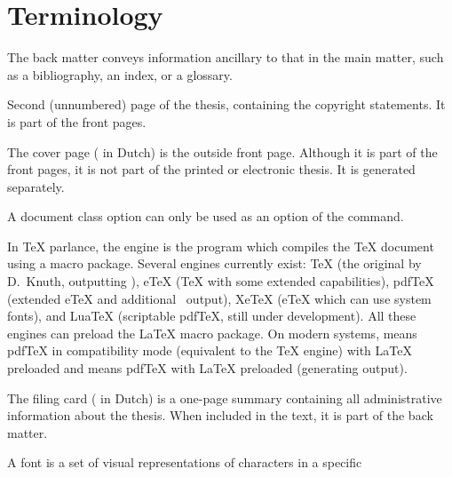 \newenvironment{termlist}%
 {\renewcommand*\descriptionlabel[1]{\hspace\labelsep
    \normalfont\scshape ##1}%
  \let\olditem\item
  \renewcommand*\item[1][??]{\olditem[##1]\leavevmode\newline\ignorespaces}%
  \newcommand*\latex{\unskip\quad\upshape (LaTeX)}%
  \description}%
 {\enddescription}

\chapter{Terminology}
\label{cha:terminology}
\begin{termlist}
\item[Back matter]
  The back matter conveys information ancillary to that in the main matter,
  such as a bibliography, an index, or a glossary.
\item[Copyright page]
  Second (unnumbered) page of the thesis, containing the copyright
  statements. It is part of the front pages.
\item[Cover page]
  The cover page ( in Dutch) is the outside front page.
  Although it is part of the front pages, it is not part of the printed or
  electronic thesis. It is generated separately.
\item[Document class option \latex]
  A document class option can only be used as an option of the
   command.
\item[Engine \latex]
  In TeX parlance, the engine is the program which compiles the TeX
  document using a macro package. Several engines currently exist: TeX (the
  original by D.\ Knuth, outputting ), eTeX (TeX with some
  extended capabilities), pdfTeX (extended eTeX and additional \PDF\
  output), XeTeX (eTeX which can use system fonts), and \mbox{LuaTeX}
  (scriptable pdfTeX, still under development). All these engines can
  preload the LaTeX macro package. On modern systems, \file{latex} means
  pdfTeX in compatibility mode (equivalent to the TeX engine) with LaTeX
  preloaded and \file{pdflatex} means pdfTeX with LaTeX preloaded
  (generating \file{.pdf} output).
\item[Filing card]
  The filing card ( in Dutch) is a one-page summary containing
  all administrative information about the thesis. When included in the
  text, it is part of the back matter.
\item[Font]
  A font is a set of visual representations of characters in a specific

\end{termlist}
